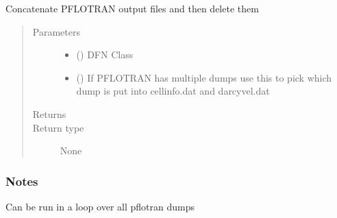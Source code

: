 \documentclass[letterpaper,10pt,english]{sphinxmanual}
\begin{document}

\begin{fulllineitems}
\label{\detokenize{pydfnworks:pydfnworks.dfnFlow.pflotran.pflotran_cleanup}}
Concatenate PFLOTRAN output files and then delete them
\begin{quote}\begin{description}
\item[{Parameters}] \leavevmode\begin{itemize}
\item {} 
 () \textendash{} DFN Class

\item {} 
 () \textendash{} If PFLOTRAN has multiple dumps use this to pick which dump is put into cellinfo.dat and darcyvel.dat

\end{itemize}

\item[{Returns}] \leavevmode


\item[{Return type}] \leavevmode
None

\end{description}\end{quote}
\subsubsection*{Notes}

Can be run in a loop over all pflotran dumps

\end{fulllineitems}

\end{document}
